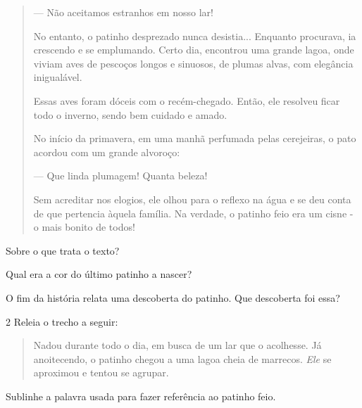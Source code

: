 \begin{escolha}
\begin{escolha}
\begin{quote}
--- Não aceitamos estranhos em nosso lar!

No entanto, o patinho desprezado nunca desistia... Enquanto procurava,
ia crescendo e se emplumando. Certo dia, encontrou uma grande lagoa,
onde viviam aves de pescoços longos e sinuosos, de plumas alvas, com
elegância inigualável.

Essas aves foram dóceis com o recém-chegado. Então, ele resolveu ficar
todo o inverno, sendo bem cuidado e amado.

No início da primavera, em uma manhã perfumada pelas cerejeiras, o pato
acordou com um grande alvoroço:

--- Que linda plumagem! Quanta beleza!

Sem acreditar nos elogios, ele olhou para o reflexo na água e se deu
conta de que pertencia àquela família. Na verdade, o patinho feio era um
cisne - o mais bonito de todos!

\end{quote}

\begin{escolha}
\item Sobre o que trata o texto?


\item Qual era a cor do último patinho a nascer?


\item O fim da história relata uma descoberta do patinho. Que descoberta foi essa?

\end{escolha}

\num{2} Releia o trecho a seguir:

\begin{quote}
Nadou durante todo o dia, em busca de um lar que o acolhesse. Já
anoitecendo, o patinho chegou a uma lagoa cheia de marrecos. \emph{Ele}
se aproximou e tentou se agrupar.
\end{quote}

\begin{escolha}
\item Sublinhe a palavra usada para fazer referência ao patinho feio.


\end{escolha}
\end{escolha}
\end{escolha}

